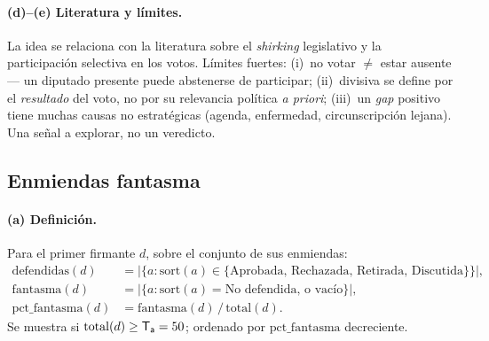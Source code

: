 \paragraph{(d)--(e) Literatura y límites.} La idea se relaciona con la literatura
sobre el \emph{shirking} legislativo y la participación selectiva en los votos.
Límites fuertes: (i)~no votar $\ne$ estar ausente — un diputado presente puede
abstenerse de participar; (ii)~\og{}divisiva\fg{} se define por el \emph{resultado}
del voto, no por su relevancia política \emph{a priori}; (iii)~un \emph{gap}
positivo tiene muchas causas no estratégicas (agenda, enfermedad, circunscripción
lejana). Una señal a explorar, no un veredicto.

\subsection{Enmiendas \og{}fantasma\fg{}}\label{sec:fantomes-es}

\paragraph{(a) Definición.} Para el primer firmante $d$, sobre el conjunto de sus
enmiendas:
\[
\begin{aligned}
\mathrm{defendidas}(d) &= \big|\{a : \mathrm{sort}(a)\in\{\text{Aprobada, Rechazada, Retirada, Discutida}\}\}\big|,\\[2pt]
\mathrm{fantasma}(d) &= \big|\{a : \mathrm{sort}(a)=\text{No defendida, o vacío}\}\big|,\\[2pt]
\mathrm{pct\_fantasma}(d) &= \mathrm{fantasma}(d)\,/\,\mathrm{total}(d).
\end{aligned}
\]
Se muestra si $\mathrm{total}(d)\ge \mathsf{T_a}=50$; ordenado por
$\mathrm{pct\_fantasma}$ decreciente.

